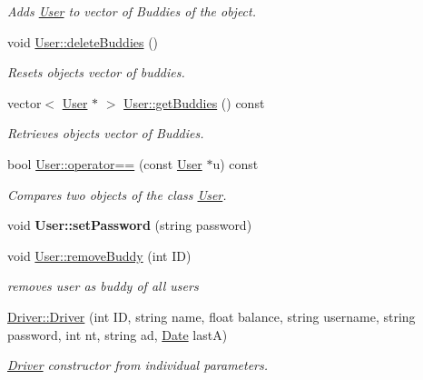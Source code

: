 \begin{DoxyCompactItemize}
\begin{DoxyCompactList}\small\item\em Adds \hyperlink{class_user}{User} to vector of Buddies of the object. \end{DoxyCompactList}\item 
\mbox{\label{group___user_gaaaa81787feebf8150cc2553e13edb8f7}} 
void \hyperlink{group___user_gaaaa81787feebf8150cc2553e13edb8f7}{User\+::delete\+Buddies} ()
\begin{DoxyCompactList}\small\item\em Resets object\textquotesingle{}s vector of buddies. \end{DoxyCompactList}\item 
vector$<$ \hyperlink{class_user}{User} $\ast$ $>$ \hyperlink{group___user_ga47d6c3dccd2b1c3050fbd0f572bac6f8}{User\+::get\+Buddies} () const
\begin{DoxyCompactList}\small\item\em Retrieves object\textquotesingle{}s vector of Buddies. \end{DoxyCompactList}\item 
bool \hyperlink{group___user_gab403e4acde558a3f968aa13b74960da5}{User\+::operator==} (const \hyperlink{class_user}{User} $\ast$u) const
\begin{DoxyCompactList}\small\item\em Compares two objects of the class \hyperlink{class_user}{User}. \end{DoxyCompactList}\item 
\mbox{\label{group___user_gab9645a2f4dc87343f9e9aeb408be41ad}} 
void {\bfseries User\+::set\+Password} (string password)
\item 
void \hyperlink{group___user_ga280617ba3ac500d59e6eb8af09dc3487}{User\+::remove\+Buddy} (int ID)
\begin{DoxyCompactList}\small\item\em removes user as buddy of all users \end{DoxyCompactList}\item 
\hyperlink{group___user_ga781d40c6af9f399284149602ead32171}{Driver\+::\+Driver} (int ID, string name, float balance, string username, string password, int nt, string ad, \hyperlink{class_date}{Date} lastA)
\begin{DoxyCompactList}\small\item\em \hyperlink{class_driver}{Driver} constructor from individual parameters. \end{DoxyCompactList}\item 

\end{DoxyCompactItemize}
